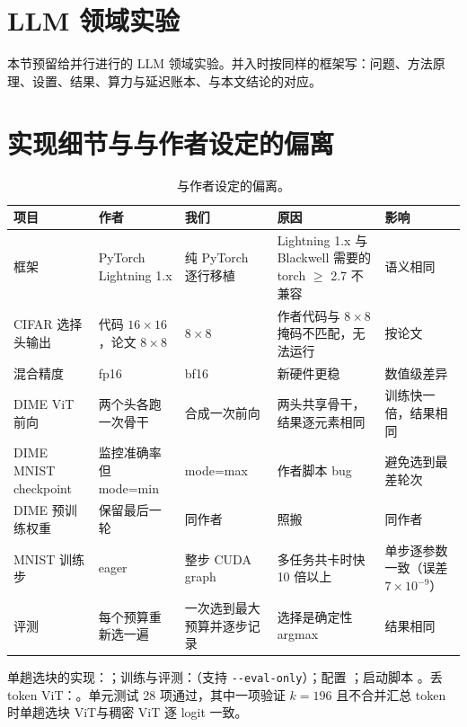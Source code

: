 \documentclass[11pt,a4paper,UTF8,fontset=none]{ctexart}
\newcommand{\onepass}{单趟选块 ViT}
\begin{document}
\section{LLM 领域实验}

本节预留给并行进行的 LLM 领域实验。并入时按同样的框架写：问题、方法原理、设置、结果、算力与延迟账本、与本文结论的对应。

\appendix
\section{实现细节与与作者设定的偏离}
\label{app:dev}

\begin{table}[H]
\centering
\caption{与作者设定的偏离。}
\footnotesize
\setlength{\tabcolsep}{4pt}
\begin{tabular}{>{\raggedright\arraybackslash}p{2.4cm}>{\raggedright\arraybackslash}p{2.5cm}>{\raggedright\arraybackslash}p{2.4cm}>{\raggedright\arraybackslash}p{4.4cm}>{\raggedright\arraybackslash}p{2.9cm}}
\toprule
项目 & 作者 & 我们 & 原因 & 影响 \\
\midrule
框架 & PyTorch Lightning 1.x & 纯 PyTorch 逐行移植 & Lightning 1.x 与 Blackwell 需要的 torch $\geq$ 2.7 不兼容 & 语义相同 \\
CIFAR 选择头输出 & 代码 $16\times16$，论文 $8\times8$ & $8\times8$ & 作者代码与 $8\times8$ 掩码不匹配，无法运行 & 按论文 \\
混合精度 & fp16 & bf16 & 新硬件更稳 & 数值级差异 \\
DIME ViT 前向 & 两个头各跑一次骨干 & 合成一次前向 & 两头共享骨干，结果逐元素相同 & 训练快一倍，结果相同 \\
DIME MNIST checkpoint & 监控准确率但 mode=min & mode=max & 作者脚本 bug & 避免选到最差轮次 \\
DIME 预训练权重 & 保留最后一轮 & 同作者 & 照搬 & 同作者 \\
MNIST 训练步 & eager & 整步 CUDA graph & 多任务共卡时快 10 倍以上 & 单步逐参数一致（误差 $7\times10^{-9}$） \\
评测 & 每个预算重新选一遍 & 一次选到最大预算并逐步记录 & 选择是确定性 argmax & 结果相同 \\
\bottomrule
\end{tabular}
\end{table}

单趟选块的实现：；训练与评测：（支持 \texttt{-{}-eval-only}）；配置 ；启动脚本 。丢 token ViT：。单元测试 28 项通过，其中一项验证 $k=196$ 且不合并汇总 token 时\onepass{}与稠密 ViT 逐 logit 一致。
\end{document}
